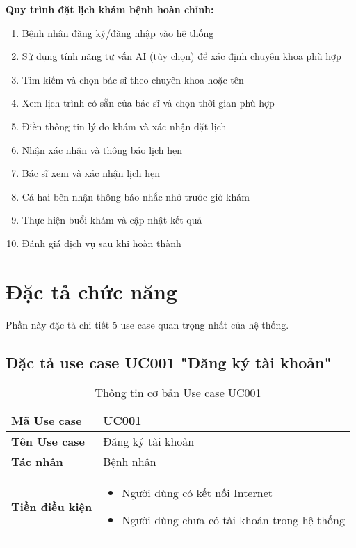 \documentclass[../DoAn.tex]{subfiles}
\begin{document}
\textbf{Quy trình đặt lịch khám bệnh hoàn chỉnh:}
\begin{enumerate}
    \item Bệnh nhân đăng ký/đăng nhập vào hệ thống
    \item Sử dụng tính năng tư vấn AI (tùy chọn) để xác định chuyên khoa phù hợp
    \item Tìm kiếm và chọn bác sĩ theo chuyên khoa hoặc tên
    \item Xem lịch trình có sẵn của bác sĩ và chọn thời gian phù hợp
    \item Điền thông tin lý do khám và xác nhận đặt lịch
    \item Nhận xác nhận và thông báo lịch hẹn
    \item Bác sĩ xem và xác nhận lịch hẹn
    \item Cả hai bên nhận thông báo nhắc nhở trước giờ khám
    \item Thực hiện buổi khám và cập nhật kết quả
    \item Đánh giá dịch vụ sau khi hoàn thành
\end{enumerate}

\section{Đặc tả chức năng}
\label{section:2.3}

Phần này đặc tả chi tiết 5 use case quan trọng nhất của hệ thống.

\subsection{Đặc tả use case UC001 "Đăng ký tài khoản"}
\label{subsection:2.3.1}

\begin{table}[H]
\centering
\begin{tabular}{|p{3cm}|p{10cm}|}
\hline
\textbf{Mã Use case} & UC001 \\
\hline
\textbf{Tên Use case} & Đăng ký tài khoản \\
\hline
\textbf{Tác nhân} & Bệnh nhân \\
\hline
\textbf{Tiền điều kiện} & 
\begin{itemize}
    \item Người dùng có kết nối Internet
    \item Người dùng chưa có tài khoản trong hệ thống
\end{itemize} \\
\hline
\end{tabular}
\caption{Thông tin cơ bản Use case UC001}
\end{table}
\end{document}
